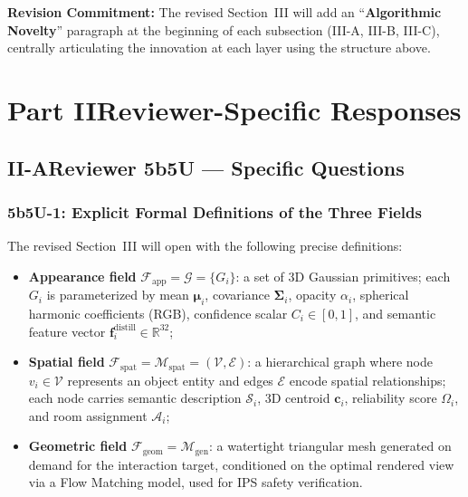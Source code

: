 \documentclass[10pt,a4paper]{article}
\newcommand{\commitbox}[1]{\smallskip\noindent\textbf{Revision Commitment:} #1\smallskip}
\begin{document}
\commitbox{The revised Section~III will add an ``\textbf{Algorithmic Novelty}'' paragraph at the beginning of each subsection (III-A, III-B, III-C), centrally articulating the innovation at each layer using the structure above.}

\section*{Part II\enspace Reviewer-Specific Responses}

\subsection*{II-A\enspace Reviewer 5b5U --- Specific Questions}

\subsubsection*{5b5U-1: Explicit Formal Definitions of the Three Fields}

The revised Section~III will open with the following precise definitions:
\begin{itemize}[leftmargin=1.8em,topsep=2pt,itemsep=2pt]
  \item \textbf{Appearance field} $\mathcal{F}_{\text{app}}=\mathcal{G}=\{G_i\}$: a set of 3D Gaussian primitives; each $G_i$ is parameterized by mean $\boldsymbol{\mu}_i$, covariance $\boldsymbol{\Sigma}_i$, opacity $\alpha_i$, spherical harmonic coefficients (RGB), confidence scalar $C_i\in[0,1]$, and semantic feature vector $\mathbf{f}_i^{\text{distill}}\in\mathbb{R}^{32}$;
  \item \textbf{Spatial field} $\mathcal{F}_{\text{spat}}=\mathcal{M}_{\text{spat}}=(\mathcal{V},\mathcal{E})$: a hierarchical graph where node $v_i\in\mathcal{V}$ represents an object entity and edges $\mathcal{E}$ encode spatial relationships; each node carries semantic description $\mathcal{S}_i$, 3D centroid $\mathbf{c}_i$, reliability score $\Omega_i$, and room assignment $\mathcal{A}_i$;
  \item \textbf{Geometric field} $\mathcal{F}_{\text{geom}}=\mathcal{M}_{\text{gen}}$: a watertight triangular mesh generated on demand for the interaction target, conditioned on the optimal rendered view via a Flow Matching model, used for IPS safety verification.
\end{itemize}
\end{document}
